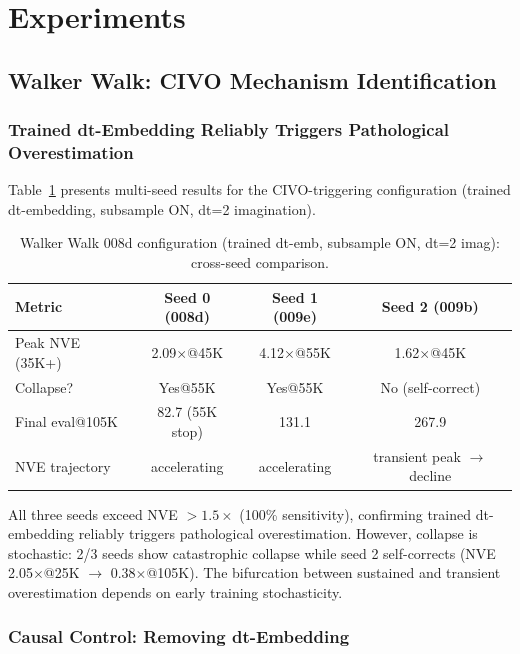 \documentclass[10pt,letterpaper]{article}
\begin{document}
\section{Experiments}

\subsection{Walker Walk: CIVO Mechanism Identification}

\subsubsection{Trained dt-Embedding Reliably Triggers Pathological Overestimation}

Table~\ref{tab:008d_crossseed} presents multi-seed results for the CIVO-triggering configuration (trained dt-embedding, subsample ON, dt=2 imagination).

\begin{table}[h]
\centering
\caption{Walker Walk 008d configuration (trained dt-emb, subsample ON, dt=2 imag): cross-seed comparison.}
\label{tab:008d_crossseed}
\begin{tabular}{lccc}
\toprule
Metric & Seed 0 (008d) & Seed 1 (009e) & Seed 2 (009b) \\
\midrule
Peak NVE (35K+) & 2.09$\times$@45K & 4.12$\times$@55K & 1.62$\times$@45K \\
Collapse? & Yes@55K & Yes@55K & No (self-correct) \\
Final eval@105K & 82.7 (55K stop) & 131.1 & 267.9 \\
NVE trajectory & accelerating & accelerating & transient peak $\rightarrow$ decline \\
\bottomrule
\end{tabular}
\end{table}

All three seeds exceed NVE $> 1.5\times$ (100\% sensitivity), confirming trained dt-embedding reliably triggers pathological overestimation. However, collapse is stochastic: 2/3 seeds show catastrophic collapse while seed 2 self-corrects (NVE 2.05$\times$@25K $\rightarrow$ 0.38$\times$@105K). The bifurcation between sustained and transient overestimation depends on early training stochasticity.

\subsubsection{Causal Control: Removing dt-Embedding}
\end{document}

